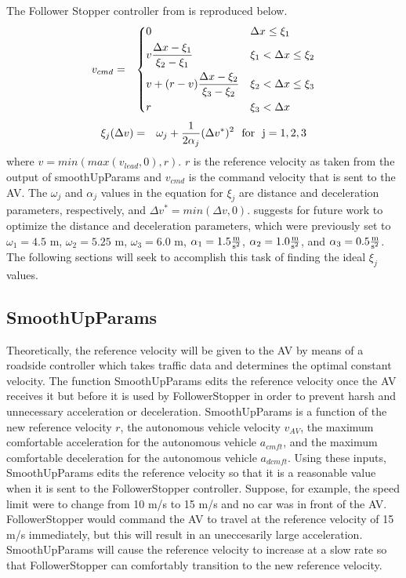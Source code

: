\documentclass[conference]{IEEEtran}
\begin{document}
The Follower Stopper controller from \cite{bhadani2019real} is reproduced below. 
\begin{eqnarray}
v_{cmd} &=& \begin{dcases}
        0 								& \Delta x\leq \xi_1 \\
        v{\Delta x-\xi_1\over\xi_2-\xi_1} 			& \xi_1< \Delta x\leq \xi_2 \\
        v+(r-v){\Delta x-\xi_2\over\xi_3-\xi_2}			& \xi_2< \Delta x\leq \xi_3 \\
        r 								& \xi_3< \Delta x \\
    \end{dcases}
\end{eqnarray}
\begin{eqnarray}
\xi_j(\Delta v)	&=& \omega_j + {1\over 2\alpha_j}(\Delta v^*)^2 \ \ {\rm for \ \ j=1, 2, 3}
\end{eqnarray}
where $v = min(max(v_{lead}, 0), r)$. $r$ is the reference velocity as taken from the output of smoothUpParams and $v_{cmd}$ is the command velocity that is sent to the AV. The $\omega_j$ and $\alpha_j$ values in the equation for $\xi_j$ are distance and deceleration parameters, respectively, and $\Delta v^*=min(\Delta v, 0)$. \cite{bhadani2019real} suggests for future work to optimize the distance and deceleration parameters, which were previously set to $\omega_1=4.5$ m, $\omega_2=5.25$ m, $\omega_3=6.0$ m, $\alpha_1=1.5 {\rm {m\over s^2}}$, $\alpha_2=1.0 {\rm {m\over s^2}}$, and $\alpha_3=0.5 {\rm {m\over s^2}}$. The following sections will seek to accomplish this task of finding the ideal $\xi_j$ values.

\subsection{SmoothUpParams}
Theoretically, the reference velocity will be given to the AV by means of a roadside controller which takes traffic data and determines the optimal constant velocity. The function SmoothUpParams edits the reference velocity once the AV receives it but before it is used by FollowerStopper in order to prevent harsh and unnecessary acceleration or deceleration. SmoothUpParams is a function of the new reference velocity $r$, the autonomous vehicle velocity $v_{AV}$, the maximum comfortable acceleration for the autonomous vehicle $a_{cmft}$, and the maximum comfortable deceleration for the autonomous vehicle $a_{dcmft}$. Using these inputs, SmoothUpParams edits the reference velocity so that it is a reasonable value when it is sent to the FollowerStopper controller. Suppose, for example, the speed limit were to change from 10 m/s to 15 m/s and no car was in front of the AV. FollowerStopper would command the AV to travel at the reference velocity of 15 m/s immediately, but this will result in an uneccesarily large acceleration. SmoothUpParams will cause the reference velocity to increase at a slow rate so that FollowerStopper can comfortably transition to the new reference velocity.
\end{document}
